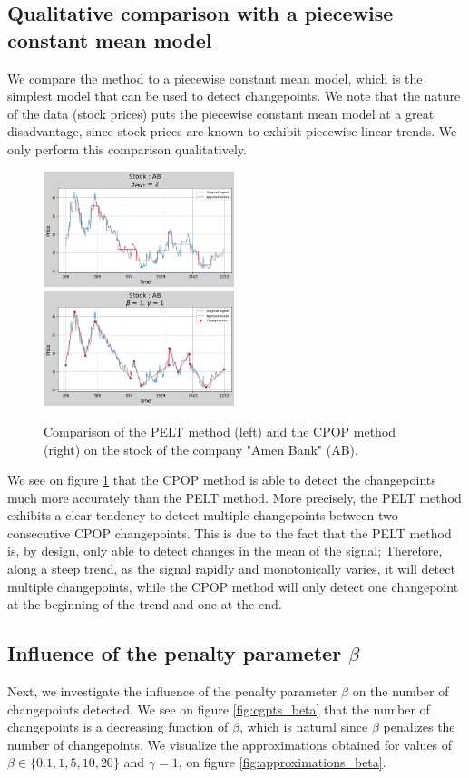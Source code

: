 \documentclass[11pt]{article}
\begin{document}
\subsection{Qualitative comparison with a piecewise constant mean model}
We compare the method to a piecewise constant mean model, which is the simplest model that can be used to detect changepoints. We note that the nature of the data (stock prices) puts the piecewise constant mean model at a great disadvantage, since stock prices are known to exhibit piecewise linear trends. We only perform this comparison qualitatively.
\begin{figure}[h]
    \centering
    \includegraphics[width=0.495\textwidth]{figures/comparaison CPOP PELT/PELT.png}
    \includegraphics[width=0.495\textwidth]{figures/comparaison CPOP PELT/CPOP.png}
    \caption{Comparison of the PELT method (left) and the CPOP method (right) on the stock of the company "Amen Bank" (AB).}
    \label{fig:comparison}
\end{figure}

We see on figure \ref{fig:comparison} that the CPOP method is able to detect the changepoints much more accurately than the PELT method. More precisely, the PELT method exhibits a clear tendency to detect multiple changepoints between two consecutive CPOP changepoints. This is due to the fact that the PELT method is, by design, only able to detect changes in the mean of the signal; Therefore, along a steep trend, as the signal rapidly and monotonically varies, it will detect multiple changepoints, while the CPOP method will only detect one changepoint at the beginning of the trend and one at the end.

\subsection{Influence of the penalty parameter $\beta$}
Next, we investigate the influence of the penalty parameter $\beta$ on the number of changepoints detected. We see on figure \ref{fig:cgpts_beta} that the number of changepoints is a decreasing function of $\beta$, which is natural since $\beta$ penalizes the number of changepoints. We visualize the approximations obtained for values of $\beta \in \{0.1, 1, 5, 10, 20\}$ and $\gamma = 1$, on figure \ref{fig:approximations_beta}.
\end{document}
